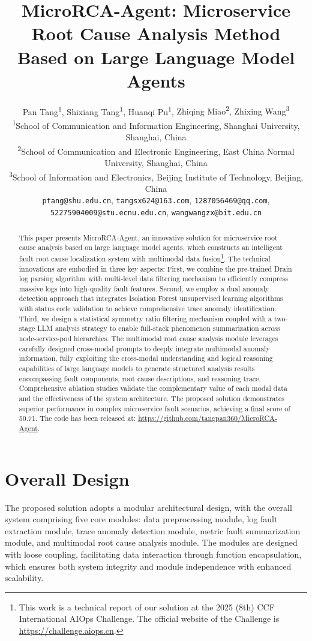 \documentclass[10pt]{article}
\title{MicroRCA-Agent: Microservice Root Cause Analysis Method Based on Large Language Model Agents}
\author{
    Pan Tang\textsuperscript{\rm 1}, Shixiang Tang\textsuperscript{\rm 1}, Huanqi Pu\textsuperscript{\rm 1}, {Zhiqing Miao\textsuperscript{\rm 2}, Zhixing Wang\textsuperscript{\rm 3}}\\
    \small
    \textsuperscript{\rm 1}School of Communication and Information Engineering, Shanghai University, Shanghai, China\\
    \small
    \textsuperscript{\rm 2}School of Communication and Electronic Engineering, East China Normal University, Shanghai, China\\
    \small
    \textsuperscript{\rm 3}School of Information and Electronics, Beijing Institute of Technology, Beijing, China\\
    \small
    \texttt{ptang@shu.edu.cn}, \texttt{tangsx624@163.com}, \texttt{1287056469@qq.com}, \texttt{52275904009@stu.ecnu.edu.cn}, \texttt{wangwangzx@bit.edu.cn}
}
\begin{document}
\maketitle
\begin{abstract}

This paper presents MicroRCA-Agent, an innovative solution for microservice root cause analysis based on large language model agents, which constructs an intelligent fault root cause localization system with multimodal data fusion\footnote{This work is a technical report of our solution at the 2025 (8th) CCF International AIOps Challenge. The official website of the Challenge is \url{https://challenge.aiops.cn}.}. The technical innovations are embodied in three key aspects: First, we combine the pre-trained Drain log parsing algorithm with multi-level data filtering mechanism to efficiently compress massive logs into high-quality fault features. Second, we employ a dual anomaly detection approach that integrates Isolation Forest unsupervised learning algorithms with status code validation to achieve comprehensive trace anomaly identification. Third, we design a statistical symmetry ratio filtering mechanism coupled with a two-stage LLM analysis strategy to enable full-stack phenomenon summarization across node-service-pod hierarchies. The multimodal root cause analysis module leverages carefully designed cross-modal prompts to deeply integrate multimodal anomaly information, fully exploiting the cross-modal understanding and logical reasoning capabilities of large language models to generate structured analysis results encompassing fault components, root cause descriptions, and reasoning trace. Comprehensive ablation studies validate the complementary value of each modal data and the effectiveness of the system architecture. The proposed solution demonstrates superior performance in complex microservice fault scenarios, achieving a final score of 50.71. The code has been released at: \url{https://github.com/tangpan360/MicroRCA-Agent}.

\end{abstract}

\section{Overall Design}
\label{sec:design}

The proposed solution adopts a modular architectural design, with the overall system comprising five core modules: data preprocessing module, log fault extraction module, trace anomaly detection module, metric fault summarization module, and multimodal root cause analysis module. The modules are designed with loose coupling, facilitating data interaction through function encapsulation, which ensures both system integrity and module independence with enhanced scalability.
\end{document}
